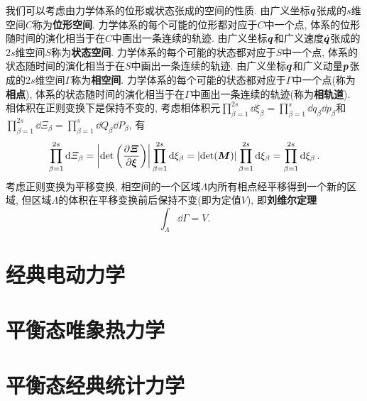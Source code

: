 我们可以考虑由力学体系的位形或状态张成的空间的性质. 由广义坐标$ \vb*{q} $张成的$ s $维空间$ C $称为\textbf{位形空间}. 力学体系的每个可能的位形都对应于$ C $中一个点, 体系的位形随时间的演化相当于在$ C $中画出一条连续的轨迹. 由广义坐标$ \vb*{q} $和广义速度$ \dot{\vb*{q}} $张成的$ 2s $维空间$ S $称为\textbf{状态空间}. 力学体系的每个可能的状态都对应于$ S $中一个点, 体系的状态随时间的演化相当于在$ S $中画出一条连续的轨迹. 由广义坐标$ \vb*{q} $和广义动量$ \vb*{p} $张成的$ 2s $维空间$ \varGamma $称为\textbf{相空间}. 力学体系的每个可能的状态都对应于$ \varGamma $中一个点(称为\textbf{相点}), 体系的状态随时间的演化相当于在$ \varGamma $中画出一条连续的轨迹(称为\textbf{相轨道}). 相体积在正则变换下是保持不变的, 考虑相体积元$ \prod_{\beta=1}^{2s} \dd{\xi_{\beta}}=\prod_{\beta=1}^{s} \dd{q_{\beta}}\dd{p_{\beta}} $和$ \prod_{\beta=1}^{2s} \dd{\varXi_{\beta}}=\prod_{\beta=1}^{s} \dd{Q_{\beta}}\dd{P_{\beta}} $, 有
\begin{equation*}
    \prod_{\beta=1}^{2s} \dd{\varXi_{\beta}} = \abs{\det\bigg(\pdv{\vb*{\varXi}}{\vb*{\xi}}\bigg)} \prod_{\beta=1}^{2s} \dd{\xi_{\beta}} = \abs{\det(\vb*{M})}\prod_{\beta=1}^{2s} \dd{\xi_{\beta}} = \prod_{\beta=1}^{2s} \dd{\xi_{\beta}}.
\end{equation*}
考虑正则变换为平移变换, 相空间的一个区域$ \varLambda $内所有相点经平移得到一个新的区域, 但区域$ \varLambda $的体积在平移变换前后保持不变(即为定值$ V $), 即\textbf{刘维尔定理}
\begin{equation}
    \int_{\varLambda} \dd{\varGamma} = V.
\end{equation}




\section[经典电动力学]{经典电动力学}\label{经典电动力学}




\section[平衡态唯象热力学]{平衡态唯象热力学}\label{平衡态唯象热力学}





\section[平衡态经典统计力学]{平衡态经典统计力学}\label{平衡态经典统计力学}